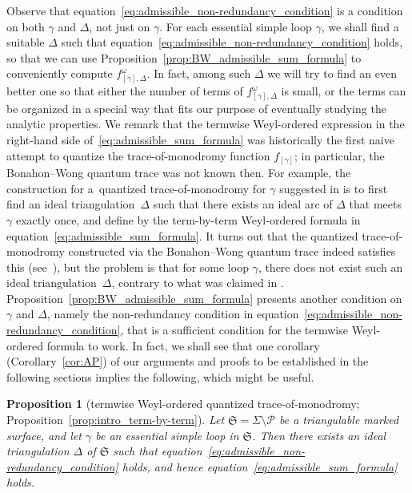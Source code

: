 \documentclass[10pt,a4paper]{amsart}
\numberwithin{equation}{section}
\newtheorem{Proposition}[Theorem]{Proposition}
\theoremstyle{definition}
\begin{document}
Observe that equation~\eqref{eq:admissible_non-redundancy_condition} is a condition on both $\gamma$ and $\Delta$, not just on $\gamma$. For each essential simple loop $\gamma$, we shall find a suitable $\Delta$ such that equation~\eqref{eq:admissible_non-redundancy_condition} holds, so that we can use Proposition~\ref{prop:BW_admissible_sum_formula} to conveniently compute $f^\omega_{[\gamma],\Delta}$. In fact, among such $\Delta$ we will try to find an even better one so that either the number of terms of $f^\omega_{[\gamma],\Delta}$ is small, or the terms can be organized in a special way that fits our purpose of eventually studying the analytic properties.
We remark that the termwise Weyl-ordered expression in the right-hand side of~\eqref{eq:admissible_sum_formula} was historically the first naive attempt to quantize the trace-of-monodromy function $f_{[\gamma]}$; in particular, the Bonahon--Wong quantum trace was not known then. For example, the construction for a~quantized trace-of-monodromy for $\gamma$ suggested in \cite{F97, CF2} is to first find an ideal triangulation~$\Delta$ such that there exists an ideal arc of $\Delta$ that meets $\gamma$ exactly once, and define  by the term-by-term Weyl-ordered formula in equation~\eqref{eq:admissible_sum_formula}. It turns out that the quantized trace-of-monodromy constructed via the Bonahon--Wong quantum trace indeed satisfies this (see~\cite{AK}), but the problem is that for some loop $\gamma$, there does not exist such an ideal triangulation~$\Delta$, contrary to what was claimed in \cite[below equation~(57)]{F97}. Proposition~\ref{prop:BW_admissible_sum_formula} presents another condition on $\gamma$ and $\Delta$, namely the non-redundancy condition in equation~\eqref{eq:admissible_non-redundancy_condition}, that is a sufficient condition for the termwise Weyl-ordered formula to work. In fact, we shall see that one corollary (Corollary~\ref{cor:AP}) of our arguments and proofs to be established in the following sections implies the following, which might be useful.
\begin{Proposition}[termwise Weyl-ordered quantized trace-of-monodromy; Proposition~\ref{prop:intro_term-by-term}]
\label{prop:term-by-term_Weyl-ordered_f_omega_gamma_Delta}
Let $\mathfrak{S} = \Sigma\setminus\mathcal{P}$ be a triangulable marked surface, and let $\gamma$ be an essential simple loop in $\mathfrak{S}$. Then there exists an ideal triangulation $\Delta$ of $\mathfrak{S}$ such that equation~\eqref{eq:admissible_non-redundancy_condition} holds, and hence equation~\eqref{eq:admissible_sum_formula} holds.
\end{Proposition}
\end{document}
